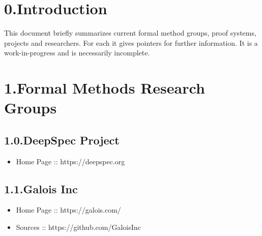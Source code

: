 \documentclass[12pt,twoside]{article}
\begin{document}
\section{0.\hspace*{0.5em}Introduction}\label{sec-introduction}%

\noindent{}This document briefly summarizes current formal method groups, proof
systems, projects and researchers. For each it gives pointers for
further information. It is a work-in-progress and is necessarily
incomplete.%

\section{1.\hspace*{0.5em}Formal Methods Research Groups}\label{sec-formal-methods-research-groups}%

\subsection{1.0.\hspace*{0.5em}DeepSpec Project}\label{sec-deepspec-project}%

\begin{itemize}[noitemsep,topsep=\mdcompacttopsep]%

\item{}Home Page :: https://deepspec.org%
\end{itemize}%

\subsection{1.1.\hspace*{0.5em}Galois Inc}\label{sec-galois-inc}%

\begin{itemize}[noitemsep,topsep=\mdcompacttopsep]%

\item{}Home Page :: https://galois.com/%

\item{}Sources :: https://github.com/GaloisInc%
\end{itemize}%
\end{document}
